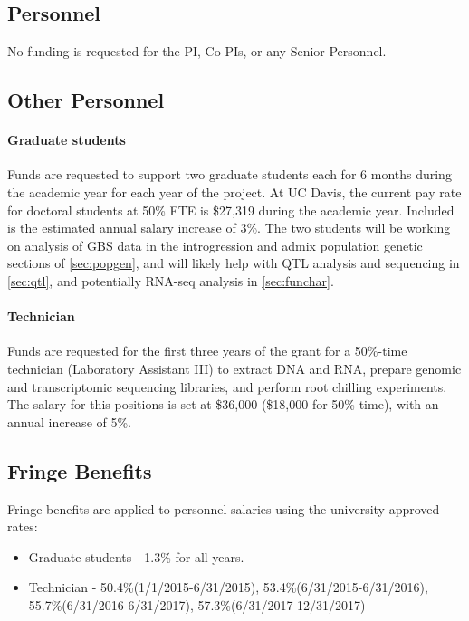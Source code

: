 \renewcommand{\thepage}{f. Budget Justification - Page \arabic{page} of 3}


\subsection*{Personnel}

No funding is requested for the PI, Co-PIs, or any Senior Personnel.

\subsection*{Other Personnel}
\paragraph{Graduate students} 
Funds are requested to support two graduate students each for 6 months during the academic year for each year of the project. At UC Davis, the current pay rate for doctoral students at 50\% FTE is \$27,319 during the academic year. Included is the estimated annual salary increase of 3\%.  The two students will be working on analysis of GBS data in the introgression and admix population genetic sections of \ref{sec:popgen}, and will likely help with QTL analysis and sequencing in \ref{sec:qtl}, and potentially RNA-seq analysis in \ref{sec:funchar}.

\paragraph{Technician}
Funds are requested for the first three years of the grant for a 50\%-time technician (Laboratory Assistant III) to extract DNA and RNA, prepare genomic and transcriptomic sequencing libraries, and perform root chilling experiments.  The salary for this positions is set at \$36,000 (\$18,000 for 50\% time), with an annual increase of 5\%.

\subsection*{Fringe Benefits}
Fringe benefits are applied to personnel salaries using the university approved rates:
\begin{itemize}
\item Graduate students - 1.3\% for all years.
\item Technician - 50.4\%(1/1/2015-6/31/2015), 53.4\%(6/31/2015-6/31/2016), 55.7\%(6/31/2016-6/31/2017), 57.3\%(6/31/2017-12/31/2017)
\end{itemize}

